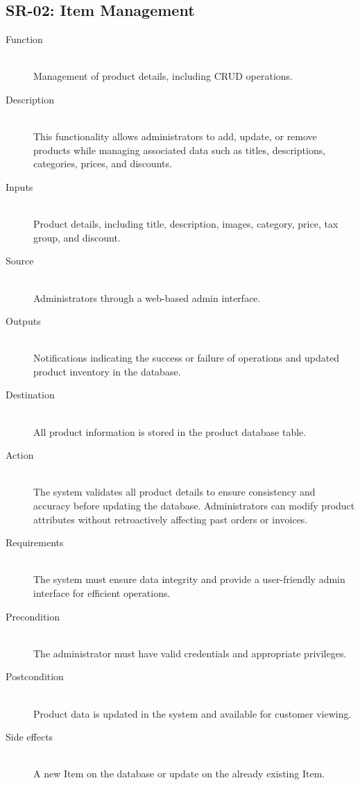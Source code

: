 \documentclass[twoside,a4paper,journal]{IEEEtran}
\begin{document}
\subsection{SR-02: Item Management}
\begin{description}
  \item[Function] \hfill \\
  Management of
  product details, including CRUD operations.
  \item[Description] \hfill \\
  This functionality allows administrators to add,
  update, or remove products while managing associated data such as titles,
  descriptions, categories, prices, and discounts.
  \item[Inputs] \hfill \\
  Product
  details, including title, description, images, category, price, tax group, and
  discount.
  \item[Source] \hfill \\
  Administrators through a web-based admin interface.
  \item[Outputs] \hfill \\
  Notifications indicating the success or failure of
  operations and updated product inventory in the database.
  \item[Destination] \hfill \\
  All product information is stored in the product
  database table.
  \item[Action] \hfill \\
  The system validates all product details to ensure
  consistency and accuracy before updating the database. Administrators can
  modify product attributes without retroactively affecting past orders or
  invoices.
  \item[Requirements] \hfill \\
  The system must ensure data integrity and provide a
  user-friendly admin interface for efficient operations.
  \item[Precondition] \hfill \\
  The administrator must have valid credentials and
  appropriate privileges.
  \item[Postcondition] \hfill \\
  Product data is updated in the system and available
  for customer viewing.
  \item[Side effects] \hfill \\
  A new Item on the database or update on the already
  existing Item.
\end{description}
\end{document}
